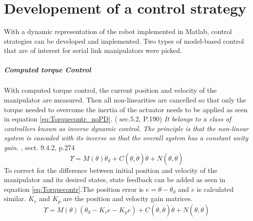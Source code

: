 \chapter{Developement of a control strategy}

With a dynamic representation of the robot implemented in Matlab, control strategies can be developed and implemented. 
Two types of model-based control that are of interest for serial link manipulators were picked.

\paragraph{Computed torque Control}
With computed torque control, the current position and velocity of the manipulator are measured. Then all non-linearities are cancelled so that only the torque needed to overcome the inertia of the actuator needs to be applied as seen in equation \ref{eq:Torquecontr_noPD}. (\cite{MathIntroRobManip} sec.5.2, P.190)
\textit{It belongs to a class of controllers known as inverse dynamic control. The principle is that the non-linear system is cascaded with its inverse so that the overall system has a constant unity gain.} \cite{CorkeRoboticVisionControl}, sect. 9.4.2, p.274\\
\begin{equation}\label{eq:Torquecontr_noPD}
	\Upsilon = M(\theta)\ddot{\theta}_d + C(\theta,\dot{\theta})\dot{\theta} + N(\theta,\dot{\theta})
\end{equation}
To correct for the difference between initial position and velocity of the manipulator and its desired states, state feedback can be added as seen in equation \ref{eq:Torquecontr}.The position error is $e=\theta - \theta_d $ and $\dot{e}$ is calculated similar. $K_v$ and $K_p$ are the position and velocity gain matrices. \cite{MathIntroRobManip}
\begin{equation}\label{eq:Torquecontr}
	\Upsilon = M(\theta)(\ddot{\theta}_d -K_v \dot{e} - K_p e) + C(\theta,\dot{\theta})\dot{\theta} + N(\theta,\dot{\theta})
\end{equation}

